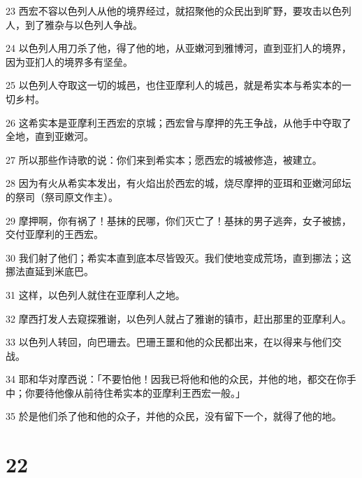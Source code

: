 \par 23 西宏不容以色列人从他的境界经过，就招聚他的众民出到旷野，要攻击以色列人，到了雅杂与以色列人争战。
\par 24 以色列人用刀杀了他，得了他的地，从亚嫩河到雅博河，直到亚扪人的境界，因为亚扪人的境界多有坚垒。
\par 25 以色列人夺取这一切的城邑，也住亚摩利人的城邑，就是希实本与希实本的一切乡村。
\par 26 这希实本是亚摩利王西宏的京城；西宏曾与摩押的先王争战，从他手中夺取了全地，直到亚嫩河。
\par 27 所以那些作诗歌的说：你们来到希实本；愿西宏的城被修造，被建立。
\par 28 因为有火从希实本发出，有火焰出於西宏的城，烧尽摩押的亚珥和亚嫩河邱坛的祭司（祭司原文作主）。
\par 29 摩押啊，你有祸了！基抹的民哪，你们灭亡了！基抹的男子逃奔，女子被掳，交付亚摩利的王西宏。
\par 30 我们射了他们；希实本直到底本尽皆毁灭。我们使地变成荒场，直到挪法；这挪法直延到米底巴。
\par 31 这样，以色列人就住在亚摩利人之地。
\par 32 摩西打发人去窥探雅谢，以色列人就占了雅谢的镇市，赶出那里的亚摩利人。
\par 33 以色列人转回，向巴珊去。巴珊王噩和他的众民都出来，在以得来与他们交战。
\par 34 耶和华对摩西说：「不要怕他！因我已将他和他的众民，并他的地，都交在你手中；你要待他像从前待住希实本的亚摩利王西宏一般。」
\par 35 於是他们杀了他和他的众子，并他的众民，没有留下一个，就得了他的地。

\chapter{22}

